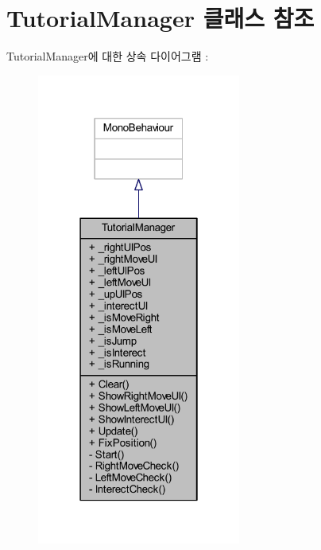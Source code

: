 \hypertarget{class_tutorial_manager}{}\section{Tutorial\+Manager 클래스 참조}
\label{class_tutorial_manager}


Tutorial\+Manager에 대한 상속 다이어그램 \+: \nopagebreak
\begin{figure}[H]
\begin{center}
\leavevmode
\includegraphics[width=190pt]{d7/d3b/class_tutorial_manager__inherit__graph}
\end{center}
\end{figure}


